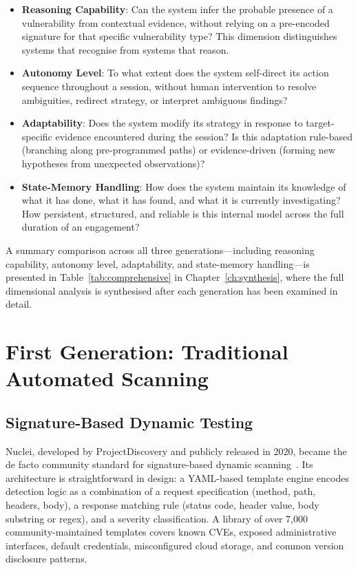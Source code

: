 \documentclass[12pt,a4paper,oneside,openany]{book}
\newcommand{\toolname}[1]{\textsf{#1}}
\begin{document}
\begin{itemize}[leftmargin=1.5em]
\item \textbf{Reasoning Capability}: Can the system infer the probable presence of a vulnerability from contextual evidence, without relying on a pre-encoded signature for that specific vulnerability type? This dimension distinguishes systems that recognise from systems that reason.

\item \textbf{Autonomy Level}: To what extent does the system self-direct its action sequence throughout a session, without human intervention to resolve ambiguities, redirect strategy, or interpret ambiguous findings?

\item \textbf{Adaptability}: Does the system modify its strategy in response to target-specific evidence encountered during the session? Is this adaptation rule-based (branching along pre-programmed paths) or evidence-driven (forming new hypotheses from unexpected observations)?

\item \textbf{State-Memory Handling}: How does the system maintain its knowledge of what it has done, what it has found, and what it is currently investigating? How persistent, structured, and reliable is this internal model across the full duration of an engagement?
\end{itemize}

A summary comparison across all three generations---including reasoning capability, autonomy level, adaptability, and state-memory handling---is presented in Table~\ref{tab:comprehensive} in Chapter~\ref{ch:synthesis}, where the full dimensional analysis is synthesised after each generation has been examined in detail.

\section{First Generation: Traditional Automated Scanning}

\subsection{Signature-Based Dynamic Testing}

\toolname{Nuclei}, developed by ProjectDiscovery and publicly released in 2020, became the de facto community standard for signature-based dynamic scanning~\citep{nuclei2020}. Its architecture is straightforward in design: a YAML-based template engine encodes detection logic as a combination of a request specification (method, path, headers, body), a response matching rule (status code, header value, body substring or regex), and a severity classification. A library of over 7,000 community-maintained templates covers known CVEs, exposed administrative interfaces, default credentials, misconfigured cloud storage, and common version disclosure patterns.
\end{document}
